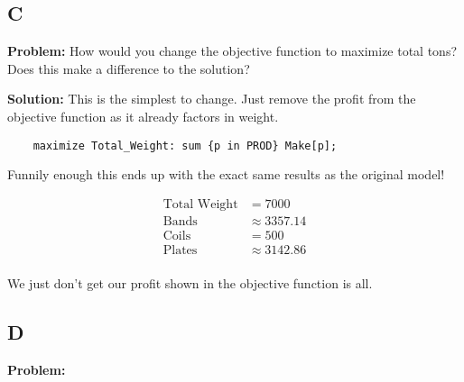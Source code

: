 \subsection*{C}

\textbf{Problem:} How would you change the objective function to maximize total tons? Does this make a difference to the solution?

\noindent\textbf{Solution:} This is the simplest to change. Just remove the profit from the objective function as it already factors in weight. 

\begin{lstlisting}
	maximize Total_Weight: sum {p in PROD} Make[p];
\end{lstlisting}

Funnily enough this ends up with the exact same results as the original model!

\begin{align*}
	\text{Total Weight} &= 7000 \\
	\text{Bands} &\approx 3357.14 \\
	\text{Coils} &= 500 \\
	\text{Plates} &\approx 3142.86 \\
\end{align*}

We just don't get our profit shown in the objective function is all. 

\subsection*{D}

\textbf{Problem:} 
